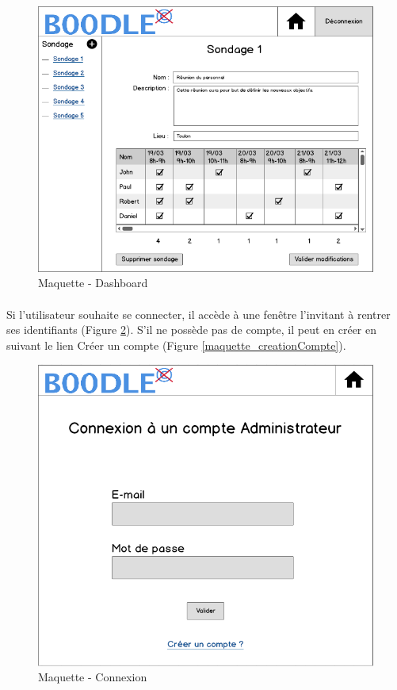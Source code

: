 \documentclass[titlepage]{report}
\begin{document}
\begin{figure}[h]
	\caption{Maquette - Dashboard}
	\label{maquette_dashboard}
	\centering
	\includegraphics[scale=0.7]{figures/maquettes/dashboard.png}
\end{figure}

\paragraph{} Si l'utilisateur souhaite se connecter, il accède à une fenêtre l'invitant à rentrer ses identifiants (Figure \ref{maquette_connexion}). 
S'il ne possède pas de compte, il peut en créer en suivant le lien Créer un compte (Figure \ref{maquette_creationCompte}).

\begin{figure}[h]
	\caption{Maquette - Connexion}
	\label{maquette_connexion}
	\centering
	\includegraphics[scale=0.7]{figures/maquettes/connexion.png}
\end{figure}
\end{document}
